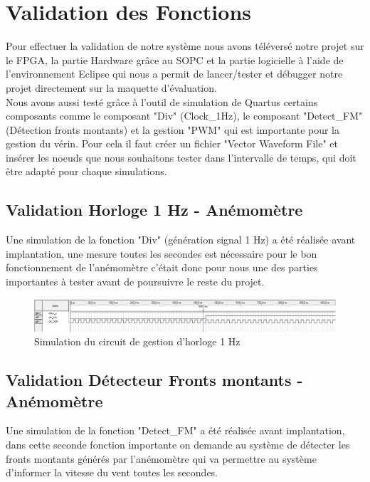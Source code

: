 \section{Validation des Fonctions}
Pour effectuer la validation de notre système nous avons téléversé notre projet sur le FPGA, la partie Hardware grâce au SOPC et la partie logicielle à l'aide de l'environnement Eclipse qui nous a permit de lancer/tester et débugger notre projet directement sur la maquette d'évaluation.\newline\\
Nous avons aussi testé grâce à l'outil de simulation de Quartus certains composants comme le composant "Div" (Clock\_1Hz), le composant "Detect\_FM" (Détection fronts montants) et la gestion "PWM" qui est importante pour la gestion du vérin. Pour cela il faut créer un fichier "Vector Waveform File" et insérer les noeuds que nous souhaitons tester dans l'intervalle de temps, qui doit être adapté pour chaque simulations.

\subsection{Validation Horloge 1 Hz - Anémomètre}

Une simulation de la fonction "Div" (génération signal 1 Hz) a été réalisée avant implantation, une mesure toutes les secondes est nécessaire pour le bon fonctionnement de l'anémomètre c'était donc pour nous une des parties importantes à tester avant de poursuivre le reste du projet.

\begin{figure}[h]
  \begin{center}
    \includegraphics[width=\textwidth]{images/Clk_1Hz.jpg}
    \caption{Simulation du circuit de gestion d'horloge 1 Hz}
  \end{center}
\end{figure}

\subsection{Validation Détecteur Fronts montants - Anémomètre}

Une simulation de la fonction "Detect\_FM" a été réalisée avant implantation, dans cette seconde fonction importante on demande au système de détecter les fronts montants générés par l'anémomètre qui va permettre au système d'informer la vitesse du vent toutes les secondes.

